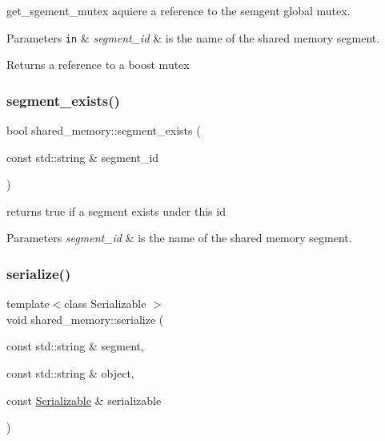 get\+\_\+sgement\+\_\+mutex aquiere a reference to the semgent global mutex. 


\begin{DoxyParams}[1]{Parameters}
\mbox{\tt in}  & {\em segment\+\_\+id} & is the name of the shared memory segment. \\
\hline
\end{DoxyParams}
\begin{DoxyReturn}{Returns}
a reference to a boost mutex 
\end{DoxyReturn}
\mbox{\label{namespaceshared__memory_a82297c2b7b85c57c53578749c9bd6429}} 
\subsubsection{\texorpdfstring{segment\+\_\+exists()}{segment\_exists()}}
{\footnotesize\ttfamily bool shared\+\_\+memory\+::segment\+\_\+exists (\begin{DoxyParamCaption}\item[{const std\+::string \&}]{segment\+\_\+id }\end{DoxyParamCaption})}



returns true if a segment exists under this id 


\begin{DoxyParams}{Parameters}
{\em segment\+\_\+id} & is the name of the shared memory segment. \\
\hline
\end{DoxyParams}
\mbox{\label{namespaceshared__memory_a003005dc269ebf79f08523dc0f8d1ed0}} 
\subsubsection{\texorpdfstring{serialize()}{serialize()}}
{\footnotesize\ttfamily template$<$class Serializable $>$ \\
void shared\+\_\+memory\+::serialize (\begin{DoxyParamCaption}\item[{const std\+::string \&}]{segment,  }\item[{const std\+::string \&}]{object,  }\item[{const \hyperlink{classSerializable}{Serializable} \&}]{serializable }\end{DoxyParamCaption})}



